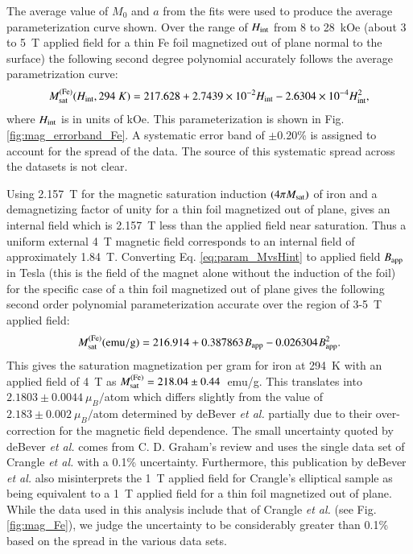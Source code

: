 \documentclass[preprint,12pt]{elsarticle}
\begin{document}
The average value of $M_0$ and $a$ from the fits were used to produce the average parameterization curve shown. Over the range of $H_{\rm int}$ from 8 to 28~kOe (about 3 to 5~T applied field for a thin Fe foil magnetized out of plane normal to the surface) the following second degree polynomial accurately follows the average parametrization curve: 
\begin{equation}
\label{eq:param_MvsHint}
M_{\rm sat}^{\rm (Fe)}(H_{\rm int},294~K)=217.628+2.7439\times10^{-2}H_{\rm int}-2.6304\times10^{-4}H_{\rm int}^2,
\end{equation}
where $H_{\rm int}$ is in units of kOe. This parameterization is shown in Fig.\ref{fig:mag_errorband_Fe}. A systematic error band of $\pm$0.20\% is assigned to account for the spread of the data. The source of this systematic spread across the datasets is not clear. 

Using 2.157~T for the magnetic saturation induction $(4\pi M_{\rm sat})$ of iron and a demagnetizing factor of unity for a thin foil magnetized out of plane, gives an internal field which is 2.157~T less than the applied field near saturation. Thus a uniform external 4~T magnetic field corresponds to an internal field of approximately 1.84~T. Converting Eq. \ref{eq:param_MvsHint} to applied field $B_{\rm app}$ in Tesla (this is the field of the magnet alone without the induction of the foil) for the specific case of a thin foil magnetized out of plane gives the following second order polynomial parameterization accurate over the region of 3-5~T applied field:
\begin{equation}
M_{\rm sat}^{\rm(Fe)}({\rm emu/g})=216.914+0.387863\hspace{.06667em}B_{\rm app}-0.026304\hspace{.06667em}B_{\rm app}^2.
\end{equation}
This gives the saturation magnetization per gram for iron at 294~K with an applied field of 4~T as $M_{\rm sat}^{\rm (Fe)}=218.04\pm0.44$~emu/g. This translates into $2.1803\pm0.0044~\mu_B/$atom which differs slightly from the value of $2.183\pm0.002~\mu_B/$atom determined by deBever {\it et al.}\cite{deBever1997} partially due to their over-correction for the magnetic field dependence. The small uncertainty quoted by  deBever {\it et al.} comes from C. D. Graham's review \cite{Graham1982} and uses the single data set of Crangle {\it et al.}\cite{Crangle1971} with a 0.1\% uncertainty. Furthermore, this publication by deBever {\it et al.} also misinterprets the 1~T applied field for Crangle's elliptical sample as being equivalent to a 1~T applied field for a thin foil magnetized out of plane.  While the data used in this analysis include that of Crangle {\it et al.} (see Fig. \ref{fig:mag_Fe}), we judge the uncertainty to be considerably greater than 0.1\% based on the spread in the various data sets. 
\end{document}
